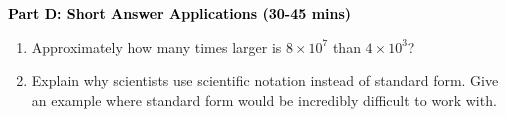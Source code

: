 \documentclass[12pt, letterpaper, fleqn]{article}
\begin{document}
\newpage

\begin{tcolorbox}[colback=customteal!20]
\large\textcolor{black}{\textbf{Part D: Short Answer Applications (30-45 mins)}}
\end{tcolorbox}

\vspace{3mm}

\begin{enumerate}[itemsep=4.2cm, leftmargin=0.6cm, resume]
\item Approximately how many times larger is $8 \times 10^7$ than $4 \times 10^3$?
\item Explain why scientists use scientific notation instead of standard form. Give an example where standard form would be incredibly difficult to work with.
\end{enumerate}
\end{document}
